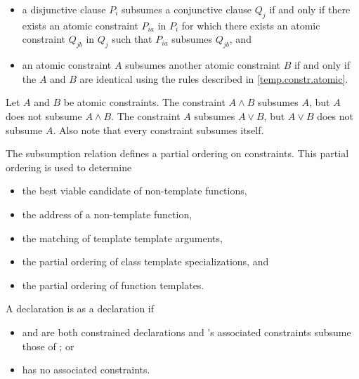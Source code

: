 \begin{itemize}
\item
a disjunctive clause $P_i$ subsumes a conjunctive clause $Q_j$ if and only
if there exists an atomic constraint $P_{ia}$ in $P_i$ for which there exists
an atomic constraint $Q_{jb}$ in $Q_j$ such that $P_{ia}$ subsumes $Q_{jb}$, and

\item an atomic constraint $A$ subsumes another atomic constraint
$B$ if and only if the $A$ and $B$ are identical using the
rules described in \ref{temp.constr.atomic}.
\end{itemize}
%
\begin{example}
Let $A$ and $B$ be atomic constraints.
%
The constraint $A \land B$ subsumes $A$, but $A$ does not subsume $A \land B$.
%
The constraint $A$ subsumes $A \lor B$, but $A \lor B$ does not subsume $A$.
%
Also note that every constraint subsumes itself.
\end{example}

\pnum
\begin{note}
The subsumption relation defines a partial ordering on constraints.
This partial ordering is used to determine

\begin{itemize}
\item the best viable candidate of non-template functions,
\item the address of a non-template function,
\item the matching of template template arguments,
\item the partial ordering of class template specializations, and
\item the partial ordering of function templates.
\end{itemize}
\end{note}

\pnum
A declaration  is
 as
a declaration  if

\begin{itemize}
\item {} and  are both constrained declarations and
's associated constraints subsume those of ; or

\item {} has no associated constraints.
\end{itemize}


